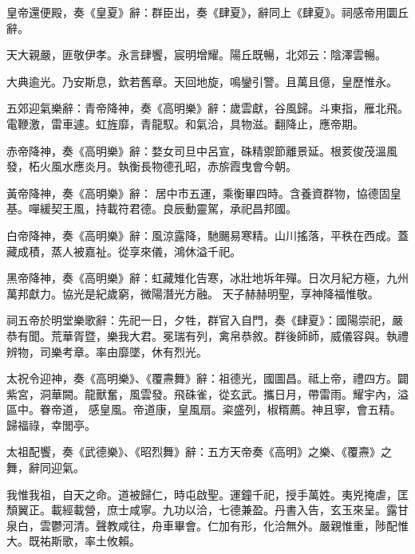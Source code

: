 \begin{pinyinscope}
 皇帝還便殿，奏《皇夏》辭：群臣出，奏《肆夏》，辭同上《肆夏》。祠感帝用圜丘辭。



 天大親嚴，匪敬伊孝。永言肆饗，宸明增耀。陽丘既暢，北郊云：陰澤雲暢。



 大典逾光。乃安斯息，欽若舊章。天回地旋，鳴鑾引警。且萬且億，皇歷惟永。



 五郊迎氣樂辭：青帝降神，奏《高明樂》辭：歲雲獻，谷風歸。斗東指，雁北飛。電鞭激，雷車遽。虹旌靡，青龍馭。和氣洽，具物滋。翻降止，應帝期。



 赤帝降神，奏《高明樂》辭：婺女司旦中呂宣，硃精禦節離景延。根荄俊茂溫風發，柘火風水應炎月。執衡長物德孔昭，赤旂霞曳會今朝。



 黃帝降神，奏《高明樂》辭：
 居中市五運，乘衡畢四時。含養資群物，協德固皇基。嘽緩契王風，持載符君德。良辰動靈駕，承祀昌邦國。



 白帝降神，奏《高明樂》辭：風涼露降，馳颺易寒精。山川搖落，平秩在西成。蓋藏成積，蒸人被嘉祉。從享來儀，鴻休溢千祀。



 黑帝降神，奏《高明樂》辭：虹藏雉化告寒，冰壯地坼年殫。日次月紀方極，九州萬邦獻力。協光是紀歲窮，微陽潛光方融。
 天子赫赫明聖，享神降福惟敬。



 祠五帝於明堂樂歌辭：先祀一日，夕牲，群官入自門，奏《肆夏》：國陽崇祀，嚴恭有聞。荒華胥暨，樂我大君。冕瑞有列，禽帛恭敘。群後師師，威儀容與。執禮辨物，司樂考章。率由靡墜，休有烈光。



 太祝令迎神，奏《高明樂》、《覆燾舞》辭：祖德光，國圖昌。祗上帝，禮四方。闢紫宮，洞華闕。龍獸奮，風雲發。飛硃雀，從玄武。攜日月，帶雷雨。耀宇內，溢區中。眷帝道，
 感皇風。帝道康，皇風扇。粢盛列，椒糈薦。神且寧，會五精。歸福祿，幸閭亭。



 太祖配饗，奏《武德樂》、《昭烈舞》辭：五方天帝奏《高明》之樂、《覆燾》之舞，辭同迎氣。



 我惟我祖，自天之命。道被歸仁，時屯啟聖。運鐘千祀，授手萬姓。夷兇掩虐，匡頹翼正。載經載營，庶士咸寧。九功以洽，七德兼盈。丹書入告，玄玉來呈。露甘泉白，雲鬱河清。聲教咸往，舟車畢會。仁加有形，化洽無外。嚴親惟重，陟配惟大。既祐斯歌，率土攸賴。




\end{pinyinscope}
